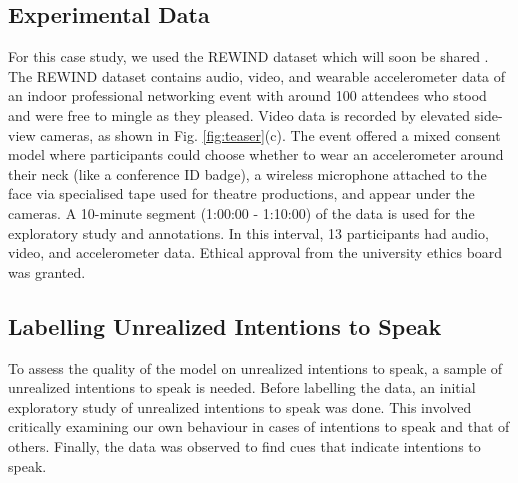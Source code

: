\documentclass[sigconf]{acmart}
\begin{document}

\subsection{Experimental Data}
For this case study, we used the REWIND dataset \cite{laughterquiros2023} which will soon be shared \cite{rewinddata}. The REWIND dataset contains audio, video, and wearable accelerometer data of an indoor professional networking event with around 100 attendees who stood and were free to mingle as they pleased. Video data is recorded by elevated side-view cameras, as shown in Fig. \ref{fig:teaser}(c). The event offered a mixed consent model where participants could choose whether to wear an accelerometer around their neck (like a conference ID badge), a wireless microphone attached to the face via specialised tape used for theatre productions, and appear under the cameras. A 10-minute segment (1:00:00 - 1:10:00) of the data is used for the exploratory study and annotations. In this interval, 13 participants had audio, video, and accelerometer data. Ethical approval from the university ethics board was granted.


\subsection{Labelling Unrealized Intentions to Speak}
\label{sec:annot}
To assess the quality of the model on unrealized intentions to speak, a sample of unrealized intentions to speak is needed. Before labelling the data, an initial exploratory study of unrealized intentions to speak was done. This involved critically examining our own behaviour in cases of intentions to speak and that of others. Finally, the data was observed to find cues that indicate intentions to speak. 

\end{document}
